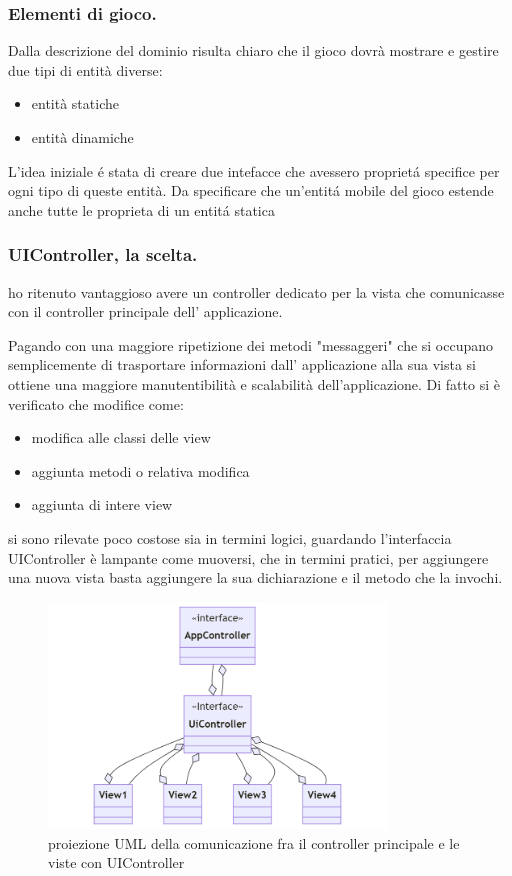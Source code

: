 \documentclass[a4paper,12pt]{report}
\begin{document}
\subsubsection{Elementi di gioco.}
Dalla descrizione del dominio risulta chiaro che il gioco dovrà mostrare e gestire due tipi di entità diverse:
\begin{itemize}
    \item entità statiche
    \item entità dinamiche
\end{itemize}
L'idea iniziale é stata di creare due intefacce che avessero proprietá specifice per ogni tipo di queste entità.
Da specificare che un'entitá mobile del gioco estende anche tutte le proprieta di un entitá statica

\subsubsection{UIController, la scelta.}
ho ritenuto vantaggioso avere un controller dedicato per la vista  che comunicasse
con il controller principale dell' applicazione.

Pagando con una maggiore ripetizione dei metodi "messaggeri" che si occupano semplicemente di trasportare informazioni
dall' applicazione alla sua vista si ottiene una maggiore manutentibilità e scalabilità dell'applicazione.
Di fatto si è verificato che modifice come:
\begin{itemize}
    \item modifica alle classi delle view
    \item aggiunta metodi o relativa modifica
    \item aggiunta di intere view
\end{itemize}
si sono rilevate poco costose sia in termini logici, guardando l'interfaccia UIController è lampante come muoversi,
che in termini pratici, per aggiungere una nuova vista basta aggiungere la sua dichiarazione e il metodo che la invochi.
\begin{figure}[H]
    \centering
    \includegraphics[width=0.8\textwidth]{images/UiControllerDesing.png}
    \caption{proiezione UML della comunicazione fra il controller principale e le viste con UIController}
\end{figure}
\end{document}
